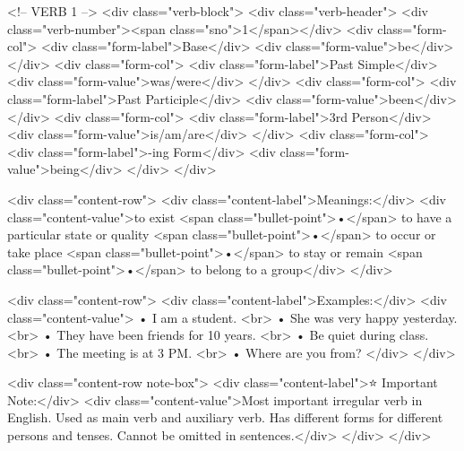         <!-- VERB 1 -->
        <div class="verb-block">
            <div class="verb-header">
                <div class="verb-number"><span class="sno">1</span></div>
                <div class="form-col">
                    <div class="form-label">Base</div>
                    <div class="form-value">be</div>
                </div>
                <div class="form-col">
                    <div class="form-label">Past Simple</div>
                    <div class="form-value">was/were</div>
                </div>
                <div class="form-col">
                    <div class="form-label">Past Participle</div>
                    <div class="form-value">been</div>
                </div>
                <div class="form-col">
                    <div class="form-label">3rd Person</div>
                    <div class="form-value">is/am/are</div>
                </div>
                <div class="form-col">
                    <div class="form-label">-ing Form</div>
                    <div class="form-value">being</div>
                </div>
            </div>
            
            <div class="content-row">
                <div class="content-label">Meanings:</div>
                <div class="content-value">to exist <span class="bullet-point">•</span> to have a particular state or quality <span class="bullet-point">•</span> to occur or take place <span class="bullet-point">•</span> to stay or remain <span class="bullet-point">•</span> to belong to a group</div>
            </div>
            
            <div class="content-row">
                <div class="content-label">Examples:</div>
                <div class="content-value">
                    • I am a student. <br>
                    • She was very happy yesterday. <br>
                    • They have been friends for 10 years. <br>
                    • Be quiet during class. <br>
                    • The meeting is at 3 PM. <br>
                    • Where are you from?
                </div>
            </div>
            
            <div class="content-row note-box">
                <div class="content-label">⭐ Important Note:</div>
                <div class="content-value">Most important irregular verb in English. Used as main verb and auxiliary verb. Has different forms for different persons and tenses. Cannot be omitted in sentences.</div>
            </div>
        </div>
        
